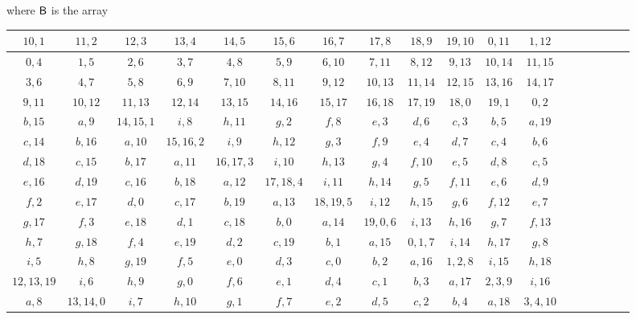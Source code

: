 \documentclass[draft, 11pt]{article}
\begin{document}
\begin{figure}[h!]
\vskip 5pt
\normalsize \flushleft where ${\sf B}$ is the array
\vskip 5pt

\renewcommand{\arraystretch}{1.2}
 \setlength\tabcolsep{1pt}
 \centering
 \small
\begin{tabular}{|c|c|c|c|c|c|c|c|c|c|c|c|c|c|c|c|c|c| }
\hline
$10,1$ & $11,2$ & $12,3$ & $13,4$ & $14,5$ & $15,6$ & $16,7$ & $17,8$ & $18,9$ & $19,10$ & $0,11$ & $1,12$ \\\hline
$0,4$ & $1,5$ & $2,6$ & $3,7$ & $4,8$ & $5,9$ & $6,10$ & $7,11$ & $8,12$ & $9,13$ & $10,14$ & $11,15$ \\\hline
$3,6$ & $4,7$ & $5,8$ & $6,9$ & $7,10$ & $8,11$ & $9,12$ & $10,13$ & $11,14$ & $12,15$ & $13,16$ & $14,17$ \\\hline
$9,11$ & $10,12$ & $11,13$ & $12,14$ & $13,15$ & $14,16$ & $15,17$ & $16,18$ & $17,19$ & $18,0$ & $19,1$ & $0,2$ \\\hline
$b,15$ & $a,9$ & $14,15,1$ & $i,8$ & $h,11$ & $g,2$ & $f,8$ & $e,3$ & $d,6$ & $c,3$ & $b,5$ & $a,19$ \\\hline
$c,14$ & $b,16$ & $a,10$ & $15,16,2$ & $i,9$ & $h,12$ & $g,3$ & $f,9$ & $e,4$ & $d,7$ & $c,4$ & $b,6$ \\\hline
$d,18$ & $c,15$ & $b,17$ & $a,11$ & $16,17,3$ & $i,10$ & $h,13$ & $g,4$ & $f,10$ & $e,5$ & $d,8$ & $c,5$ \\\hline
$e,16$ & $d,19$ & $c,16$ & $b,18$ & $a,12$ & $17,18,4$ & $i,11$ & $h,14$ & $g,5$ & $f,11$ & $e,6$ & $d,9$ \\\hline
$f,2$ & $e,17$ & $d,0$ & $c,17$ & $b,19$ & $a,13$ & $18,19,5$ & $i,12$ & $h,15$ & $g,6$ & $f,12$ & $e,7$ \\\hline
$g,17$ & $f,3$ & $e,18$ & $d,1$ & $c,18$ & $b,0$ & $a,14$ & $19,0,6$ & $i,13$ & $h,16$ & $g,7$ & $f,13$ \\\hline
$h,7$ & $g,18$ & $f,4$ & $e,19$ & $d,2$ & $c,19$ & $b,1$ & $a,15$ & $0,1,7$ & $i,14$ & $h,17$ & $g,8$ \\\hline
$i,5$ & $h,8$ & $g,19$ & $f,5$ & $e,0$ & $d,3$ & $c,0$ & $b,2$ & $a,16$ & $1,2,8$ & $i,15$ & $h,18$ \\\hline
$12,13,19$ & $i,6$ & $h,9$ & $g,0$ & $f,6$ & $e,1$ & $d,4$ & $c,1$ & $b,3$ & $a,17$ & $2,3,9$ & $i,16$ \\\hline
$a,8$ & $13,14,0$ & $i,7$ & $h,10$ & $g,1$ & $f,7$ & $e,2$ & $d,5$ & $c,2$ & $b,4$ & $a,18$ & $3,4,10$ \\\hline
\end{tabular}
%

\end{figure}
\end{document}
